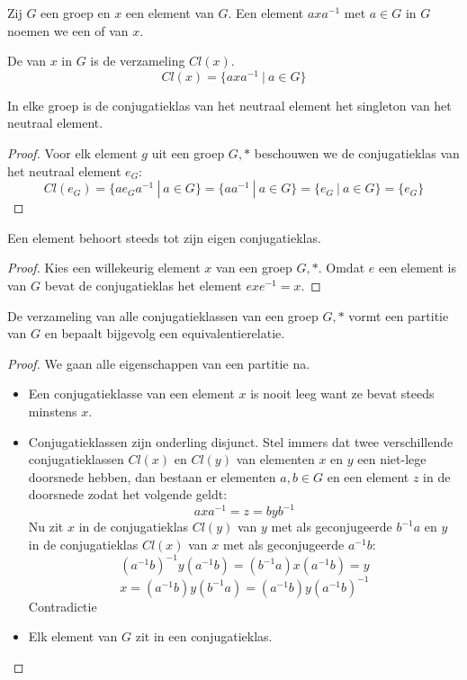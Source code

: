 \documentclass[main.tex]{subfiles}
\begin{document}
\begin{de}
  Zij $G$ een groep en $x$ een element van $G$.
  Een element $axa^{-1}$ met $a\in G$ in $G$ noemen we een  of  van $x$.
\end{de}

\begin{de}
  De  van $x$ in $G$ is de verzameling $Cl(x)$.
  \[ Cl(x) = \{ axa^{-1}\ |\ a \in G \} \]
\end{de}

\begin{st}
  In elke groep is de conjugatieklas van het neutraal element het singleton van het neutraal element.

  \begin{proof}
    Voor elk element $g$ uit een groep $G,*$ beschouwen we de conjugatieklas van het neutraal element $e_{G}$:
    \[ Cl(e_{G}) = \{ ae_{G}a^{-1}\ |\ a \in G \} = \{ aa^{-1}\ |\ a \in G \} = \{ e_{G}\ |\ a \in G \} = \{ e_{G} \} \]
  \end{proof}
\end{st}

\begin{ei}
  \label{ei:element-eigen-conjugatieklas}
  Een element behoort steeds tot zijn eigen conjugatieklas.

  \begin{proof}
    Kies een willekeurig element $x$ van een groep $G,*$.
    Omdat $e$ een element is van $G$ bevat de conjugatieklas het element $exe^{-1} = x$.
  \end{proof}
\end{ei}

\begin{ei}
  \label{ei:conjugatieklassen-partitie}
  De verzameling van alle conjugatieklassen van een groep $G,*$ vormt een partitie van $G$ en bepaalt bijgevolg een equivalentierelatie.
  \begin{proof}
    We gaan alle eigenschappen van een partitie na.
    \begin{itemize}
    \item Een conjugatieklasse van een element $x$ is nooit leeg want ze bevat steeds minstens $x$.
    \item Conjugatieklassen zijn onderling disjunct.
      Stel immers dat twee verschillende conjugatieklassen $Cl(x)$ en $Cl(y)$ van elementen $x$ en $y$ een niet-lege doorsnede hebben, dan bestaan er elementen $a,b \in G$ en een element $z$ in de doorsnede zodat het volgende geldt:
      \[ axa^{-1} = z = byb^{-1} \]
      Nu zit $x$ in de conjugatieklas $Cl(y)$ van $y$ met als geconjugeerde $b^{-1}a$ en $y$ in de conjugatieklas $Cl(x)$ van $x$ met als geconjugeerde $a^{-1}b$:
      \[ (a^{-1}b)^{-1}y(a^{-1}b) = (b^{-1}a)x(a^{-1}b) = y \]
      \[ x = (a^{-1}b) y(b^{-1}a) = (a^{-1}b) y (a^{-1}b)^{-1} \]
      Contradictie
    \item Elk element van $G$ zit in een conjugatieklas.
    \end{itemize}
  \end{proof}
\end{ei}
\end{document}
